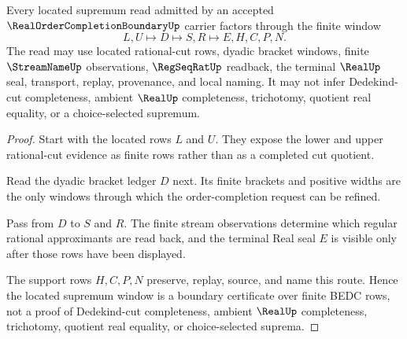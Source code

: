 \begin{theorem}
\label{thm:real-order-completion-located-supremum-window}
Every located supremum read admitted by an accepted $\RealOrderCompletionBoundaryUp$ carrier factors through the finite window
$$
L,U \longmapsto D \longmapsto S,R \longmapsto E,H,C,P,N .
$$
The read may use located rational-cut rows, dyadic bracket windows, finite $\StreamNameUp$ observations, $\RegSeqRatUp$ readback, the terminal $\RealUp$ seal, transport, replay, provenance, and local naming. It may not infer Dedekind-cut completeness, ambient $\RealUp$ completeness, trichotomy, quotient real equality, or a choice-selected supremum.
\end{theorem}
\begin{proof}
Start with the located rows $L$ and $U$. They expose the lower and upper rational-cut evidence as finite rows rather than as a completed cut quotient.

Read the dyadic bracket ledger $D$ next. Its finite brackets and positive widths are the only windows through which the order-completion request can be refined.

Pass from $D$ to $S$ and $R$. The finite stream observations determine which regular rational approximants are read back, and the terminal Real seal $E$ is visible only after those rows have been displayed.

The support rows $H,C,P,N$ preserve, replay, source, and name this route. Hence the located supremum window is a boundary certificate over finite BEDC rows, not a proof of Dedekind-cut completeness, ambient $\RealUp$ completeness, trichotomy, quotient real equality, or choice-selected suprema.
\end{proof}


\begin{closurestatus}{\RealOrderCompletionBoundaryUp}
  \theoryclosure{\seedClosure}
  \formalstatus{\unformalizedV}
\end{closurestatus}
